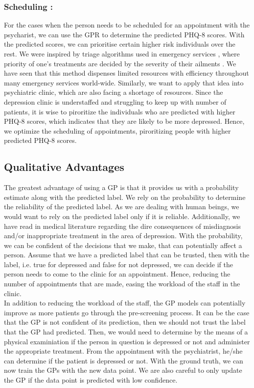 \documentclass{article}
\begin{document}
	\subsubsection{Scheduling :}
	For the cases when the person needs to be scheduled for an appointment with the psycharist, we can use the GPR to determine the predicted PHQ-8 scores. 
	With the predicted scores, we can prioritise certain higher risk individuals over the rest. 
	We were inspired by triage algorithms used in emergency services \cite{shah2015managing,oredsson2011systematic}, where priority of one's treatments are decided by the severity of their ailments \cite{wiki:Triage}.
	We have seen that this method dispenses limited resources with efficiency \cite{rosedale2011effectiveness} throughout many emergency services world-wide. 
	Similarly, we want to apply that idea into psychiatric clinic, which are also facing a shortage of resources. 
	Since the depression clinic is understaffed and struggling to keep up with number of patients, it is wise to piroritize the individuals who are predicted with higher PHQ-8 scores, which indicates that they are likely to be more depressed. 
	Hence, we optimize the scheduling of appointments, piroritizing people with higher predicted PHQ-8 scores.

	\subsection{Qualitative Advantages}
	The greatest advantage of using a GP is that it provides us with a probability estimate along with the predicted label. 
	We rely on the probability to determine the reliability of the predicted label. 
	As we are dealing with human beings, we would want to rely on the predicted label only if it is reliable. 
	Additionally, we have read in medical literature regarding the dire consequences of misdiagnosis and/or inappropriate treatment \cite{nasrallah2015consequences,bowden2001strategies,dunner2003clinical} in the area of depression. 
	With the probability, we can be confident of the decisions that we make, that can potentially affect a person. 
	Assume that we have a predicted label that can be trusted, then with the label, i.e. true for depressed and false for not depressed, we can decide if the person needs to come to the clinic for an appointment. 
	Hence, reducing the number of appointments that are made, easing the workload of the staff in the clinic. \\
	
	In addition to reducing the workload of the staff, the GP models can potentially improve as more patients go through the pre-screening process.
	It can be the case that the GP is not confident of its prediction, then we should not trust the label that the GP had predicted. 
	Then, we would need to determine by the means of a physical examiniation if the person in question is depressed or not and administer the appropriate treatment. 
	From the appointment with the psychiatrist, he/she can determine if the patient is depressed or not. 
	With the ground truth, we can now train the GPs with the new data point. 
	We are also careful to only update the GP if the data point is predicted with low confidence. \\
\end{document}
